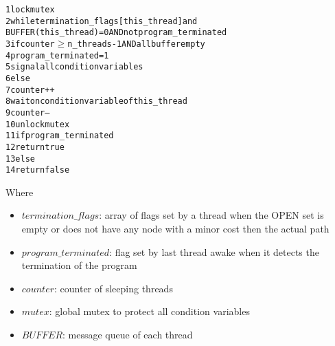 \begin{alltt}
    1 lock mutex
    2 while termination_flags[this_thread] and
    BUFFER(this_thread) = 0 AND not program_terminated
    3   if counter \( \geq \) n_threads - 1 AND all buffer empty
    4       program_terminated = 1
    5       signal all condition variables
    6   else
    7       counter++
    8       wait on condition variable of this_thread
    9       counter--
    10 unlock mutex
    11 if program_terminated
    12   return true
    13 else
    14   return false
\end{alltt}

Where
\begin{itemize}
    \item $termination\_flags$: array of flags set by a thread when the OPEN set is empty or does not have any node with a minor cost then the actual path
    \item $program\_terminated$: flag set by last thread awake when it detects the termination of the program
    \item $counter$: counter of sleeping threads
    \item $mutex$: global mutex to protect all condition variables
    \item $BUFFER$: message queue of each thread
\end{itemize}

